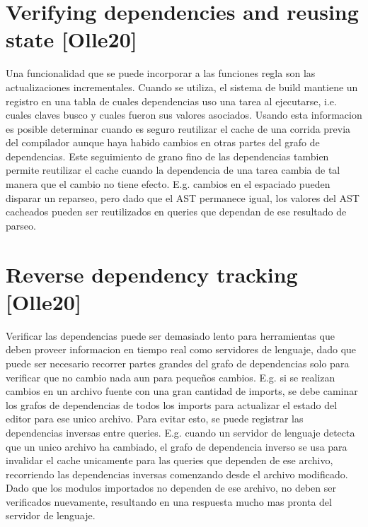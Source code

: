 \documentclass[12pt, a4paper]{report}
\begin{document}
\section*{Verifying dependencies and reusing state [Olle20]}

Una funcionalidad que se puede incorporar a las funciones regla son las actualizaciones incrementales.
Cuando se utiliza, el sistema de build mantiene un registro en una tabla de cuales dependencias uso una tarea al ejecutarse, i.e. cuales claves busco y cuales fueron sus valores asociados.
Usando esta informacion es posible determinar cuando es seguro reutilizar el cache de una corrida previa del compilador aunque haya habido cambios en otras partes del grafo de dependencias.
Este seguimiento de grano fino de las dependencias tambien permite reutilizar el cache cuando la dependencia de una tarea cambia de tal manera que el cambio no tiene efecto.
E.g. cambios en el espaciado pueden disparar un reparseo, pero dado que el AST permanece igual, los valores del AST cacheados pueden ser reutilizados en queries que dependan de ese resultado de parseo.
\cite{olle_query_based}

\section*{Reverse dependency tracking [Olle20]}

Verificar las dependencias puede ser demasiado lento para herramientas que deben proveer informacion en tiempo real como servidores de lenguaje, dado que puede ser necesario recorrer partes grandes del grafo de dependencias solo para verificar que no cambio nada aun para pequeños cambios.
E.g. si se realizan cambios en un archivo fuente con una gran cantidad de imports, se debe caminar los grafos de dependencias de todos los imports para actualizar el estado del editor para ese unico archivo.
Para evitar esto, se puede registrar las dependencias inversas entre queries.
E.g. cuando un servidor de lenguaje detecta que un unico archivo ha cambiado, el grafo de dependencia inverso se usa para invalidar el cache unicamente para las queries que dependen de ese archivo, recorriendo las dependencias inversas comenzando desde el archivo modificado.
Dado que los modulos importados no dependen de ese archivo, no deben ser verificados nuevamente, resultando en una respuesta mucho mas pronta del servidor de lenguaje.
\cite{olle_query_based}
\end{document}
